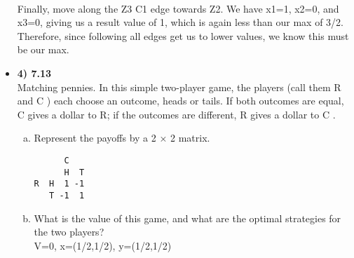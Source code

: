 \documentclass[11pt]{article}
\begin{document}
\begin{itemize}
\\Finally, move along the Z3 C1 edge towards Z2. We have x1=1, x2=0, and x3=0, giving us a result value of 1, which is again less than our max of 3/2. 
\\Therefore, since following all edges get us to lower values, we know this must be our max.
\item \textbf{4) 7.13}
\\Matching pennies. In this simple two-player game, the players (call them R and C ) each choose an outcome, heads or tails. If both outcomes are equal, C gives a dollar to R; if the outcomes are different, R gives a dollar to C .
\begin{enumerate}[(a)]
\item Represent the payoffs by a 2 × 2 matrix.
\begin{verbatim}
      C
      H  T
R  H  1 -1
   T -1  1
\end{verbatim}
\item What is the value of this game, and what are the optimal strategies for the two players?
\\V=0, x=(1/2,1/2), y=(1/2,1/2)
\end{enumerate}

\end{itemize}
\end{document}

